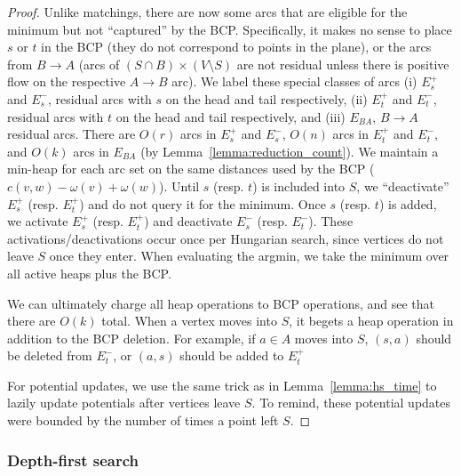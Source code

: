 \documentclass[11pt]{article}
\theoremstyle{plain}
\begin{document}
\begin{proof}
	Unlike matchings, there are now some arcs that are eligible for the
	minimum but not ``captured'' by the BCP.
	Specifically, it makes no sense to place $s$ or $t$ in the BCP
	(they do not correspond to points in the plane), or the arcs from
	$B \to A$ (arcs of $(S \cap B) \times (V \setminus S)$ are not residual
	unless there is positive flow on the respective $A \to B$ arc).
	We label these special classes of arcs (i) $E_s^+$ and $E_s^-$,
	residual arcs with $s$ on the head and tail respectively, (ii)
	$E_t^+$ and $E_t^-$, residual arcs with $t$ on the head and tail
	respectively, and (iii) $E_{BA}$, $B \to A$ residual arcs.
	There are $O(r)$ arcs in $E_s^+$ and $E_s^-$, $O(n)$ arcs in $E_t^+$
	and $E_t^-$, and $O(k)$ arcs in $E_{BA}$
	(by Lemma~\ref{lemma:reduction_count}).
	We maintain a min-heap for each arc set on the same distances used
	by the BCP ($c(v, w) - \omega(v) + \omega(w)$).
	Until $s$ (resp. $t$) is included into $S$, we ``deactivate'' $E_s^+$
	(resp. $E_t^+$) and do not query it for the minimum.
	Once $s$ (resp. $t$) is added, we activate $E_s^+$ (resp. $E_t^+$) and
	deactivate $E_s^-$ (resp. $E_t^-$).
	These activations/deactivations occur once per Hungarian search, since
	vertices do not leave $S$ once they enter.
	When evaluating the argmin, we take the minimum over all active heaps
	plus the BCP.

	We can ultimately charge all heap operations to BCP operations, and
	see that there are $O(k)$ total.
	When a vertex moves into $S$, it begets a heap operation in addition
	to the BCP deletion.
	For example, if $a \in A$ moves into $S$, $(s, a)$ should be deleted
	from $E_t^-$, or $(a, s)$ should be added to $E_t^+$


	For potential updates, we use the same trick as in
	Lemma~\ref{lemma:hs_time} to lazily update potentials after vertices
	leave $S$.
	To remind, these potential updates were bounded by the number of times
	a point left $S$.

\end{proof}


\subsubsection{Depth-first search}
\end{document}

